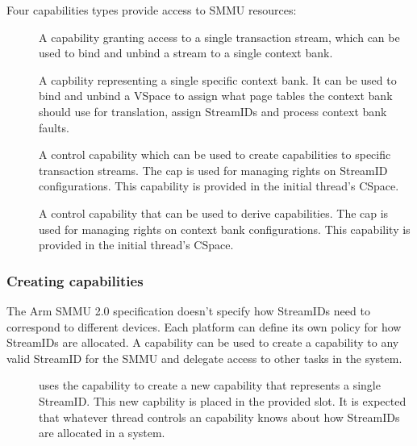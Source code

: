 Four capabilities types provide access to SMMU resources:
\begin{description}
    \item[] A capability granting access to a single 
        transaction stream, which can be used to bind and unbind a stream to a
        single context bank.
    \item[] A capbility representing a single specific context
        bank. It can be used to bind and unbind a VSpace to assign what page
        tables the context bank should use for translation, assign StreamIDs and
        process context bank faults.
    \item[] A control capability which can be used to
        create  capabilities to specific transaction streams.
        The  cap is used for managing rights on
        StreamID configurations. This capability is provided in the initial
        thread's CSpace.
    \item[] A control capability that can be used to
        derive  capabilities. The 
        cap is used for managing rights on context bank configurations.
        This capability is provided in the initial thread's CSpace.
\end{description}


\subsubsection{Creating  capabilities}
\label{sec:smmuv2-creating-sel4-arm-sid-capabilities}

The Arm SMMU 2.0 specification doesn't specify how StreamIDs need to correspond
to different devices. Each platform can define its own policy for how StreamIDs
are allocated. A  capability can be used to create
a capability to any valid StreamID for the SMMU and delegate access to other
tasks in the system.

\begin{description}
\item[] uses the
     capability to create a new 
    capability that represents a single StreamID.  This new capbility is placed
    in the provided slot.  It is expected that whatever thread controls an 
     capability knows about how StreamIDs are
    allocated in a system.
\end{description}

